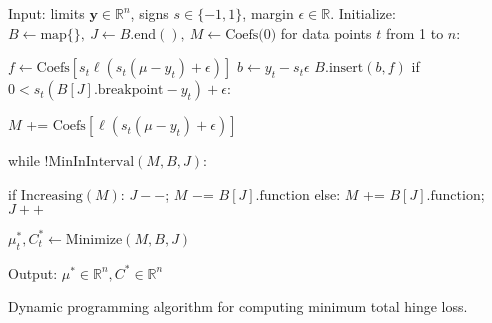 \documentclass{article}
\begin{document}
\begin{algorithm}[H]
\begin{algorithmic}[1]
\STATE Input: 
limits $\mathbf y\in\mathbb R^n$, 
signs $s\in\{-1,1\}$, 
margin $\epsilon\in\mathbb R$.
\STATE Initialize: 
$B\gets\text{map}\{\},\ J\gets B.\text{end}(),\ M\gets\text{Coefs(0)}$
\STATE for data points $t$ from 1 to $n$:
\begin{ALC@g}
  \STATE $f\gets\text{Coefs}[s_t\ell(s_t(\mu-y_t)+\epsilon)]$
  \STATE $b\gets y_t - s_t\epsilon$
  \STATE $B.\text{insert}(b, f)$ \label{line:insert}
  \STATE if $0 < s_t(B[J].\text{breakpoint}-y_t)+\epsilon$:
  \begin{ALC@g}
    \STATE $M$ += $\text{Coefs}[\ell(s_t(\mu-y_t)+\epsilon)]$
    \label{line:add-coefs}
  \end{ALC@g}
  \STATE while $!\text{MinInInterval}(M,B,J)$:
  \label{line:while}
  \begin{ALC@g}
    \STATE if $\text{Increasing}(M)$: $J--$; $M$ $-$= $B[J].\text{function}$
    \label{line:increasing}
    \STATE else: $M$ += $B[J].\text{function}$; $J++$
    \label{line:else}
  \end{ALC@g}
  \STATE $\mu_t^*, C_t^*\gets\text{Minimize}(M,B,J)$
  \label{line:Minimize}
\end{ALC@g}
\STATE Output: $\mu^*\in\mathbb R^n, C^*\in\mathbb R^n$
\caption{\label{algo:dp}Dynamic programming algorithm for
  computing minimum total hinge loss.}
\end{algorithmic}
\end{algorithm}
\end{document}
